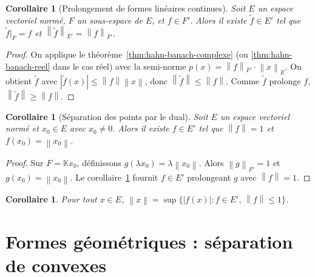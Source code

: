 \documentclass[a4paper,12pt]{book}
\newcommand{\K}{\mathbb{K}}
\newcommand{\norm}[1]{\left\| #1 \right\|}
\newcommand{\abs}[1]{\left| #1 \right|}
\theoremstyle{definition}
\theoremstyle{plain}
\newtheorem{corollaire}[definition]{Corollaire}
\theoremstyle{remark}
\begin{document}
\begin{corollaire}[Prolongement de formes linéaires continues]\label{cor:prolongement-norme}
Soit $E$ un espace vectoriel normé, $F$ un sous-espace de $E$, et $f \in F'$.
Alors il existe $\tilde{f} \in E'$ tel que $\tilde{f}|_F = f$ et
$\norm{\tilde{f}}_{E'} = \norm{f}_{F'}$.
\end{corollaire}

\begin{proof}
On applique le théorème~\ref{thm:hahn-banach-complexe} (ou \ref{thm:hahn-banach-reel}
dans le cas réel) avec la semi-norme $p(x) = \norm{f}_{F'} \cdot \norm{x}_E$.
On obtient $\tilde{f}$ avec $\abs{\tilde{f}(x)} \leq \norm{f}\norm{x}$, donc
$\norm{\tilde{f}} \leq \norm{f}$. Comme $\tilde{f}$ prolonge $f$,
$\norm{\tilde{f}} \geq \norm{f}$.
\end{proof}

\begin{corollaire}[Séparation des points par le dual]\label{cor:separation-points}
Soit $E$ un espace vectoriel normé et $x_0 \in E$ avec $x_0 \neq 0$. Alors il existe
$f \in E'$ tel que $\norm{f} = 1$ et $f(x_0) = \norm{x_0}$.
\end{corollaire}

\begin{proof}
Sur $F = \K x_0$, définissons $g(\lambda x_0) = \lambda \norm{x_0}$. Alors
$\norm{g}_{F'} = 1$ et $g(x_0) = \norm{x_0}$. Le corollaire~\ref{cor:prolongement-norme}
fournit $f \in E'$ prolongeant $g$ avec $\norm{f} = 1$.
\end{proof}

\begin{corollaire}\label{cor:norme-dual}
Pour tout $x \in E$,
$\norm{x} = \sup\{\abs{f(x)} : f \in E',\, \norm{f} \leq 1\}$.
\end{corollaire}


\section{Formes géométriques : séparation de convexes}
\label{sec:separation}

\end{document}
